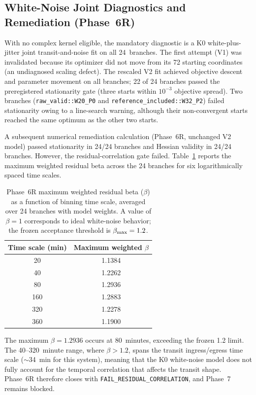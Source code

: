 \documentclass[11pt]{article}
\begin{document}
\subsection{White-Noise Joint Diagnostics and Remediation (Phase~6R)}
\label{sec:phase6r}

With no complex kernel eligible, the mandatory diagnostic is a K0
white-plus-jitter joint transit-and-noise fit on all 24~branches.  The
first attempt (V1) was invalidated because its optimizer did not move from
its 72 starting coordinates (an undiagnosed scaling defect).  The rescaled
V2 fit achieved objective descent and parameter movement on all branches;
22 of 24 branches passed the preregistered stationarity gate (three starts
within $10^{-3}$ objective spread).  Two branches
(\texttt{raw\_valid::W20\_P0} and \texttt{reference\_included::W32\_P2})
failed stationarity owing to a line-search warning, although their
non-convergent starts reached the same optimum as the other two starts.

A subsequent numerical remediation calculation (Phase~6R, unchanged V2
model) passed stationarity in 24/24 branches and Hessian validity in
24/24 branches.  However, the residual-correlation gate failed.
Table~\ref{tab:beta} reports the maximum weighted residual beta across the
24 branches for six logarithmically spaced time scales.

\begin{table}[ht]
\centering
\caption{Phase~6R maximum weighted residual beta ($\beta$) as a function of
  binning time scale, averaged over 24 branches with model weights.  A value
  of $\beta=1$ corresponds to ideal white-noise behavior; the frozen
  acceptance threshold is $\beta_{\rm max}=1.2$.}
\label{tab:beta}
\begin{tabular}{cc}
\toprule
Time scale (min) & Maximum weighted $\beta$ \\
\midrule
 20  & 1.1384 \\
 40  & 1.2262 \\
 80  & 1.2936 \\
160  & 1.2883 \\
320  & 1.2278 \\
360  & 1.1900 \\
\bottomrule
\end{tabular}
\end{table}

The maximum $\beta = 1.2936$ occurs at 80~minutes, exceeding the frozen
1.2 limit.  The 40--320~minute range, where $\beta > 1.2$, spans the
transit ingress/egress time scale ($\sim$34~min for this system), meaning
that the K0 white-noise model does not fully account for the temporal
correlation that affects the transit shape.  Phase~6R therefore closes with
\texttt{FAIL\_RESIDUAL\_CORRELATION}, and Phase~7 remains blocked.
\end{document}
